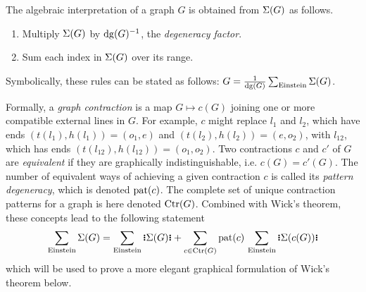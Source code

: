 \documentclass[11pt]{article}
\numberwithin{equation}{section}
\begin{document}
\begin{ax}\label{ax:rules-of-interpretation}
The algebraic interpretation of a graph $G$ is obtained from $\Sigma (G)$ as follows.
\begin{enumerate}
  \item Multiply $\Sigma (G)$ by $\mathrm{dg}(G)^{-1}$, the \textit{degeneracy factor}.
  \item Sum each index in $\Sigma (G)$ over its range.
\end{enumerate}
Symbolically, these rules can be stated as follows: $G=\frac {1}{\mathrm{dg}(G)}\sum_{\mathrm{Einstein}}\Sigma (G)$.
\end{ax}


\begin{dfn}
Formally, a \textit{graph contraction} is a map $G\mapsto c(G)$ joining one or more compatible external lines in $G$.
For example, $c$ might replace $l_1$ and $l_2$, which have ends $(t(l_1),h(l_1))=(o_1,e)$ and $(t(l_2),h(l_2))=(e,o_2)$, with $l_{12}$, which has ends $(t(l_{12}),h(l_{12}))=(o_1,o_2)$.
Two contractions $c$ and $c'$ of $G$ are \textit{equivalent} if they are graphically indistinguishable, i.e. $c(G)=c'(G)$.
The number of equivalent ways of achieving a given contraction $c$ is called its \textit{pattern degeneracy}, which is denoted $\mathrm{pat}(c)$.
The complete set of unique contraction patterns for a graph is here denoted $\mathrm{Ctr}(G)$.
Combined with Wick's theorem, these concepts lead to the following statement
\begin{align}\label{eq:wicks-theorem-for-summand-graphs}
  \sum_{\mr{Einstein}}
  \Si(G)
=
  \sum_{\mr{Einstein}}
  \gno{\Si(G)}
+
  \sum_{c\in\mr{Ctr}(G)}
  \mr{pat}(c)\,
  \sum_{\mr{Einstein}}
  \gno{\Si(c(G))}
\end{align}
which will be used to prove a more elegant graphical formulation of Wick's theorem below.
\end{dfn}
\end{document}

